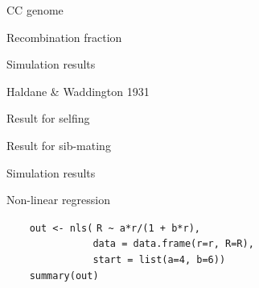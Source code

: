 \documentclass[aspectratio=169,12pt,t]{beamer}
\begin{document}
\begin{frame}[c]{CC genome}


\end{frame}


\begin{frame}[c]{Recombination fraction}
\end{frame}


\begin{frame}[c]{Simulation results}
\end{frame}


\begin{frame}[c]{Haldane \& Waddington 1931}


\end{frame}


\begin{frame}[c]{Result for selfing}


\end{frame}


\begin{frame}[c]{Result for sib-mating}


\end{frame}


\begin{frame}[c]{Simulation results}
\end{frame}



\begin{frame}[fragile]{Non-linear regression}

\vspace{5mm}

{
\verb|    out <- nls(| {\tt \vhilit R \verb|~| a*r/(1 + b*r)}\verb|,| \\
\verb|               data = data.frame(r=r, R=R),| \\
\verb|               start = list(a=4, b=6))| \\
\verb|    summary(out)|
}

\end{frame}
\end{document}
